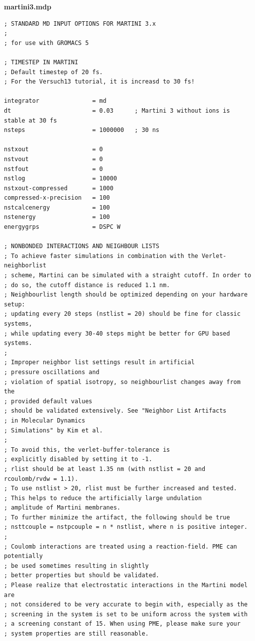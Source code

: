 \begin{vlinesbox}
\fontsize{8pt}{7pt}\selectfont
\textbf{martini3.mdp}
\begin{verbatim}
; STANDARD MD INPUT OPTIONS FOR MARTINI 3.x
;
; for use with GROMACS 5

; TIMESTEP IN MARTINI
; Default timestep of 20 fs.
; For the Versuch13 tutorial, it is increasd to 30 fs!

integrator               = md
dt                       = 0.03      ; Martini 3 without ions is stable at 30 fs
nsteps                   = 1000000   ; 30 ns

nstxout                  = 0
nstvout                  = 0
nstfout                  = 0
nstlog                   = 10000
nstxout-compressed       = 1000
compressed-x-precision   = 100
nstcalcenergy            = 100
nstenergy                = 100
energygrps               = DSPC W

; NONBONDED INTERACTIONS AND NEIGHBOUR LISTS
; To achieve faster simulations in combination with the Verlet-neighborlist
; scheme, Martini can be simulated with a straight cutoff. In order to
; do so, the cutoff distance is reduced 1.1 nm.
; Neighbourlist length should be optimized depending on your hardware setup:
; updating every 20 steps (nstlist = 20) should be fine for classic systems,
; while updating every 30-40 steps might be better for GPU based systems.
;
; Improper neighbor list settings result in artificial
; pressure oscillations and
; violation of spatial isotropy, so neighbourlist changes away from the 
; provided default values
; should be validated extensively. See "Neighbor List Artifacts
; in Molecular Dynamics 
; Simulations" by Kim et al.
;
; To avoid this, the verlet-buffer-tolerance is
; explicitly disabled by setting it to -1.
; rlist should be at least 1.35 nm (with nstlist = 20 and rcoulomb/rvdw = 1.1).
; To use nstlist > 20, rlist must be further increased and tested.
; This helps to reduce the artificially large undulation
; amplitude of Martini membranes.
; To further minimize the artifact, the following should be true
; nsttcouple = nstpcouple = n * nstlist, where n is positive integer.
;
; Coulomb interactions are treated using a reaction-field. PME can potentially
; be used sometimes resulting in slightly
; better properties but should be validated.
; Please realize that electrostatic interactions in the Martini model are
; not considered to be very accurate to begin with, especially as the
; screening in the system is set to be uniform across the system with
; a screening constant of 15. When using PME, please make sure your
; system properties are still reasonable.


\end{verbatim}
\end{vlinesbox}

